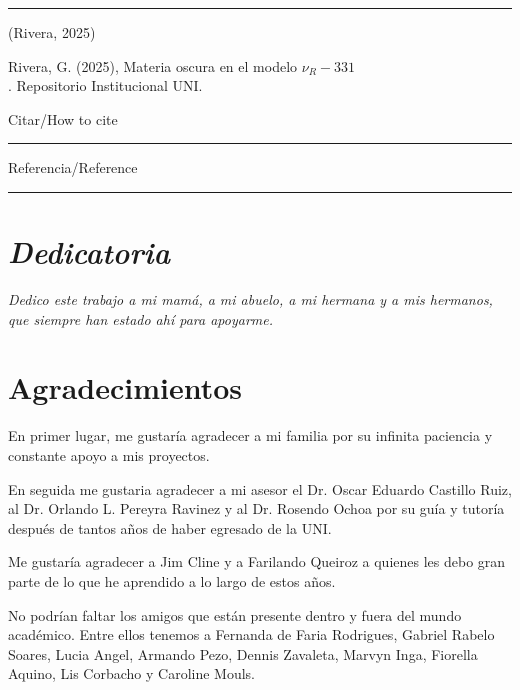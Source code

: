 \documentclass[11pt,spanish]{report}
\begin{document}
\noindent\rule{16cm}{0.6pt}
\vspace{-0.4in}
\begin{paracol}{2}

\switchcolumn* 
\noindent (Rivera, 2025)

\noindent Rivera, G. (2025), Materia oscura en el modelo $\nu_R-331$ \\ . Repositorio Institucional UNI.

\switchcolumn

\centering

Citar/How to cite \\

\vspace{-0.2in}
\noindent\rule{4.5cm}{0.6pt}
\vspace{-0.6in}
\noindent Referencia/Reference

\end{paracol}
\vspace{-0.2in}
\noindent\rule{16cm}{0.6pt}

\newpage


\chapter*{\hfill \textit{Dedicatoria}}

\begin{flushright}
\textit{Dedico este trabajo a mi mamá, a mi abuelo, a mi hermana y a mis hermanos, que siempre han estado ahí para apoyarme.}
\end{flushright}


\chapter*{Agradecimientos}
En primer lugar, me gustaría agradecer a mi familia por su infinita paciencia y constante apoyo a mis proyectos.

En seguida me gustaria agradecer a mi asesor el Dr. Oscar Eduardo Castillo Ruiz, al Dr. Orlando L. Pereyra Ravinez y al Dr. Rosendo Ochoa por su guía y tutoría después de tantos años de haber egresado de la UNI.

Me gustaría agradecer a Jim Cline y a Farilando Queiroz a quienes les debo gran parte de lo que he aprendido a lo largo de estos años.  

No podrían faltar los amigos que están presente dentro y fuera del mundo académico. Entre ellos tenemos a Fernanda de Faria Rodrigues, Gabriel Rabelo Soares, Lucia Angel, Armando Pezo, Dennis Zavaleta, Marvyn Inga, Fiorella Aquino, Lis Corbacho y Caroline Mouls.
\end{document}
